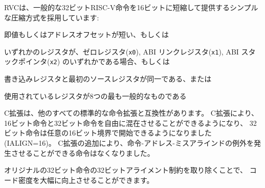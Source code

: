 RVCは、一般的な32ビットRISC-V命令を16ビットに短縮して提供するシンプルな圧縮方式を採用しています:
\begin{tightlist}
\item 即値もしくはアドレスオフセットが短い、もしくは
\item いずれかのレジスタが、ゼロレジスタ({\tt x0}), ABI リンクレジスタ({\tt x1}), ABI スタックポインタ({\tt x2}) のいずれかである場合、もしくは
\item 書き込みレジスタと最初のソースレジスタが同一である、または
\item 使用されているレジスタが8つの最も一般的なものである
\end{tightlist}

\begin{comment}
The C extension is compatible with all other standard instruction
extensions.  The C extension allows 16-bit instructions to be freely
intermixed with 32-bit instructions, with the latter now able to start
on any 16-bit boundary, i.e., IALIGN=16.  With the addition of the C
extension, no instructions can raise instruction-address-misaligned
exceptions.
\end{comment}

C拡張は、他のすべての標準的な命令拡張と互換性があります。
C拡張により、16ビット命令と32ビット命令を自由に混在させることができるようになり、
32ビット命令は任意の16ビット境界で開始できるようになりました(IALIGN=16)。
C拡張の追加により、命令-アドレス-ミスアラインドの例外を発生させることができる命令はなくなりました。

\begin{commentary}
\begin{comment}
Removing the 32-bit alignment constraint on the original 32-bit
instructions allows significantly greater code density.
\end{comment}
オリジナルの32ビット命令の32ビットアライメント制約を取り除くことで、
コード密度を大幅に向上させることができます。
\end{commentary}

\begin{comment}
The compressed instruction encodings are mostly common across RV32C,
RV64C, and RV128C, but as shown in Table~\ref{rvcopcodemap}, a few
opcodes are used for different purposes depending on base ISA width.
For example, the wider address-space RV64C and RV128C variants require
additional opcodes to compress loads and stores of 64-bit integer
values, while RV32C uses the same opcodes to compress loads and stores
of single-precision floating-point values.  Similarly, RV128C requires
additional opcodes to capture loads and stores of 128-bit integer
values, while these same opcodes are used for loads and stores of
double-precision floating-point values in RV32C and RV64C.  If the C
extension is implemented, the appropriate compressed floating-point
load and store instructions must be provided whenever the relevant
standard floating-point extension (F and/or D) is also implemented.
In addition, RV32C includes a compressed jump and link instruction to
compress short-range subroutine calls, where the same opcode is used
to compress ADDIW for RV64C and RV128C.
\end{comment}

